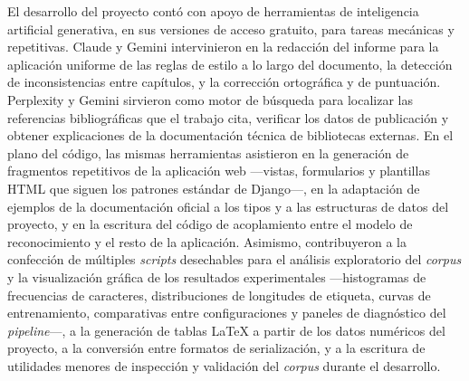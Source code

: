 El desarrollo del proyecto contó con apoyo de herramientas de inteligencia artificial generativa, en sus versiones de acceso gratuito, para tareas mecánicas y repetitivas. Claude y Gemini intervinieron en la redacción del informe para la aplicación uniforme de las reglas de estilo a lo largo del documento, la detección de inconsistencias entre capítulos, y la corrección ortográfica y de puntuación. Perplexity y Gemini sirvieron como motor de búsqueda para localizar las referencias bibliográficas que el trabajo cita, verificar los datos de publicación y obtener explicaciones de la documentación técnica de bibliotecas externas. En el plano del código, las mismas herramientas asistieron en la generación de fragmentos repetitivos de la aplicación web —vistas, formularios y plantillas HTML que siguen los patrones estándar de Django—, en la adaptación de ejemplos de la documentación oficial a los tipos y a las estructuras de datos del proyecto, y en la escritura del código de acoplamiento entre el modelo de reconocimiento y el resto de la aplicación. Asimismo, contribuyeron a la confección de múltiples \textit{scripts} desechables para el análisis exploratorio del \textit{corpus} y la visualización gráfica de los resultados experimentales —histogramas de frecuencias de caracteres, distribuciones de longitudes de etiqueta, curvas de entrenamiento, comparativas entre configuraciones y paneles de diagnóstico del \textit{pipeline}—, a la generación de tablas \LaTeX{} a partir de los datos numéricos del proyecto, a la conversión entre formatos de serialización, y a la escritura de utilidades menores de inspección y validación del \textit{corpus} durante el desarrollo.
